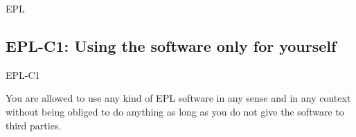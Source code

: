 \begin{license}{EPL}
\newcommand{\organizeYourModifications}{Organize your modifications in a way
  that they are covered by the existing EPL licensing statements.}
\newcommand{\addHeaderToNewFiles}{If you add new source code files, insert a
  header containing your copyright line and an EPL adequate licensing the
  statement.} 

\newcommand{\useSeparateDirectory}[1]{Arrange your #1 distribution so that the
  integrated EPL and the \emph{licensing files} clearly refer only to the
  embedded library and do not disturb the licensing of your own overarching
  work. It's a good tradition to keep the embedded components like libraries,
  modules, snippets, or plugins in separate directories which also contains all 
  additional licensing elements.}

\subsection{EPL-C1: Using the software only for yourself}
\begin{lsuc}{EPL-C1}



  \begin{lsucrequiresnothing}
    \item You are allowed to use any kind of EPL software in any sense and in
    any context without being obliged to do anything as long as you do not
    give the software to third parties.
  \end{lsucrequiresnothing}

  \begin{lsucprohibits}
    \lsucitem{\dontChangeCopyrightNotices}
  \end{lsucprohibits}


\end{lsuc}
\end{license}
